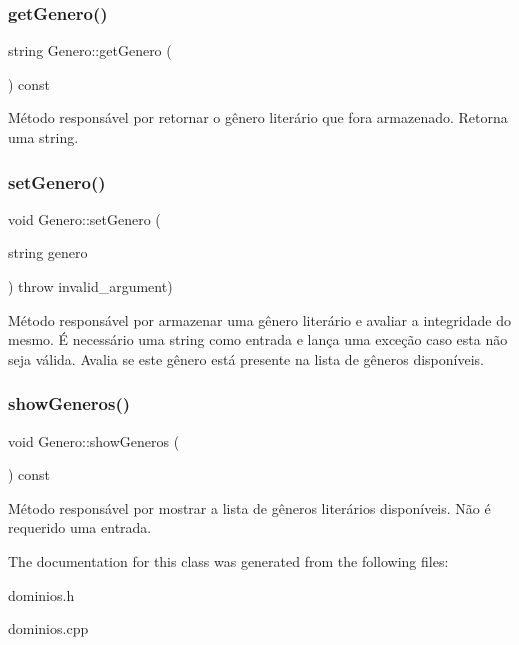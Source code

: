 \subsubsection{\texorpdfstring{get\+Genero()}{getGenero()}}
{\footnotesize\ttfamily string Genero\+::get\+Genero (\begin{DoxyParamCaption}{ }\end{DoxyParamCaption}) const\hspace{0.3cm}{\ttfamily [inline]}}

Método responsável por retornar o gênero literário que fora armazenado. Retorna uma string. \mbox{\label{classGenero_adc53f59f5147fb37da8782378cffda9c}} 
\subsubsection{\texorpdfstring{set\+Genero()}{setGenero()}}
{\footnotesize\ttfamily void Genero\+::set\+Genero (\begin{DoxyParamCaption}\item[{string}]{genero }\end{DoxyParamCaption}) throw  invalid\+\_\+argument) }

Método responsável por armazenar uma gênero literário e avaliar a integridade do mesmo. É necessário uma string como entrada e lança uma exceção caso esta não seja válida. Avalia se este gênero está presente na lista de gêneros disponíveis. \mbox{\label{classGenero_a1f7c047f6d2c5b75520673a5c3cca6a6}} 
\subsubsection{\texorpdfstring{show\+Generos()}{showGeneros()}}
{\footnotesize\ttfamily void Genero\+::show\+Generos (\begin{DoxyParamCaption}{ }\end{DoxyParamCaption}) const}

Método responsável por mostrar a lista de gêneros literários disponíveis. Não é requerido uma entrada. 

The documentation for this class was generated from the following files\+:\begin{DoxyCompactItemize}
\item 
dominios.\+h\item 
dominios.\+cpp\end{DoxyCompactItemize}
